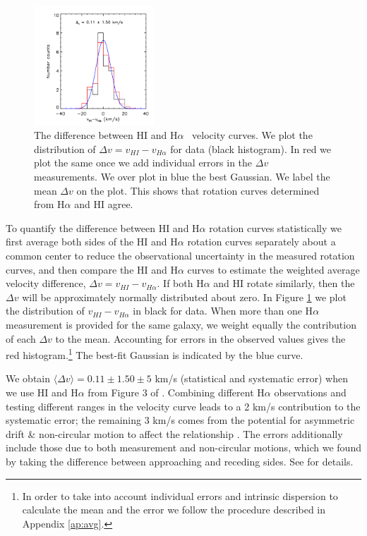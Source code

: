 \documentclass[useAMS,usenatbib,twocolumn]{mn2e}
\newcommand{\ha}{H$\alpha$}
\begin{document}
\begin{figure}
\begin{center}
\includegraphics[trim= 0cm 0cm 0cm 0cm, clip = true,
width=0.4\textwidth]{figures/vivalpha.png}
\caption{The difference between HI and \ha~ velocity curves.
We plot the distribution of $\Delta {v}=v_{HI}-v_{H\alpha}$ for
\citet{Swaters2009} data (black histogram). In red we plot the same
once we add individual errors in the $\Delta v$ measurements. We over plot in
blue the best Gaussian. We label the mean $\Delta v$ on the plot. This
shows that rotation curves determined from \ha{} and HI agree.}
\label{h1-ha-rot}
\end{center}
\end{figure}


To quantify the difference between HI and \ha{} rotation curves statistically
we first average both sides of the HI and \ha{} rotation curves
separately about a common center to reduce the observational uncertainty in the
measured rotation curves, and then compare the HI and \ha{} curves to estimate
the weighted average velocity difference, $\Delta v = v_{HI} - v_{H\alpha}$.
If both \ha{} and HI rotate similarly, then the $\Delta v$ will
be approximately normally distributed about zero.
In Figure \ref{h1-ha-rot} we plot the distribution of $v_{HI}-v_{H\alpha}$ in
black for \citet{Swaters2009} data. When more than one
\ha{} measurement is provided for the same galaxy, we weight equally the
contribution of each  $\Delta v$ to the mean. Accounting for errors in the
observed values gives the red histogram.\footnote{
In order to take into account individual errors and
intrinsic dispersion to calculate the mean and the error we follow the
procedure described in Appendix \ref{ap:avg}.}  The best-fit Gaussian is
indicated by the blue curve.

We obtain $\langle \Delta v\rangle=0.11\pm 1.50 \pm 5$ km/s (statistical and
systematic error) when we use HI and \ha{}
from Figure 3 of \citet{Swaters2009}.  Combining different \ha{} observations
and testing different ranges in the velocity curve leads to a 2 km/s
contribution to the systematic error; the remaining 3 km/s comes from the
potential for asymmetric drift \& non-circular motion to affect the
relationship \citep{Swaters2009, deblok2002}. The errors
additionally include those due to both measurement and non-circular motions,
which we found by taking the difference between approaching and receding
sides. See \citet{Swaters2009} for details. 
\end{document}
